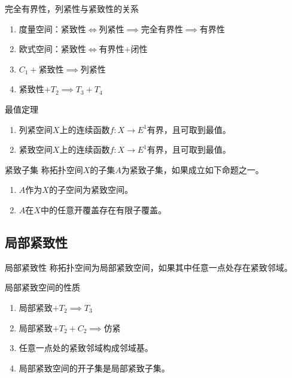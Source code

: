 \documentclass[lang = cn, scheme = chinese, thmcnt = section, usesamecnt]{elegantbook}
\begin{document}
\begin{theorem}{完全有界性，列紧性与紧致性的关系}
	\begin{enumerate}
		\item 度量空间：紧致性$\iff$列紧性$\implies$完全有界性$\implies$有界性
		\item 欧式空间：紧致性$\iff$有界性$+$闭性
		\item $C_1+$紧致性$\implies$列紧性
		\item 紧致性$+T_2\implies T_3+T_4$
	\end{enumerate}
\end{theorem}

\begin{theorem}{最值定理}
	\begin{enumerate}
		\item 列紧空间$X$上的连续函数$f:X\to E^1$有界，且可取到最值。
		\item 紧致空间$X$上的连续函数$f:X\to E^1$有界，且可取到最值。
	\end{enumerate}
\end{theorem}

\begin{definition}{紧致子集}
	称拓扑空间$X$的子集$A$为紧致子集，如果成立如下命题之一。
	\begin{enumerate}
		\item $A$作为$X$的子空间为紧致空间。
		\item $A$在$X$中的任意开覆盖存在有限子覆盖。
	\end{enumerate}
\end{definition}

\subsection{局部紧致性}

\begin{definition}{局部紧致性}
	称拓扑空间为局部紧致空间，如果其中任意一点处存在紧致邻域。
\end{definition}

\begin{theorem}{局部紧致空间的性质}
	\begin{enumerate}
		\item 局部紧致$+T_2\implies T_3$
		\item 局部紧致$+T_2+C_2\implies$仿紧
		\item 任意一点处的紧致邻域构成邻域基。
		\item 局部紧致空间的开子集是局部紧致子集。
	\end{enumerate}
\end{theorem}
\end{document}
